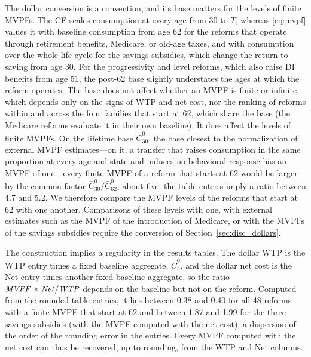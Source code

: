 The dollar conversion is a convention, and its base matters for the levels of finite MVPFs. The CE scales consumption at every age from 30 to $T$, whereas \eqref{eq:mvpf} values it with baseline consumption from age 62 for the reforms that operate through retirement benefits, Medicare, or old-age taxes, and with consumption over the whole life cycle for the savings subsidies, which change the return to saving from age 30. For the progressivity and level reforms, which also raise DI benefits from age 51, the post-62 base slightly understates the ages at which the reform operates. The base does not affect whether an MVPF is finite or infinite, which depends only on the signs of WTP and net cost, nor the ranking of reforms within and across the four families that start at 62, which share the base (the Medicare reforms evaluate it in their own baseline). It does affect the levels of finite MVPFs. On the lifetime base $\bar C^{0}_{30}$, the base closest to the normalization of external MVPF estimates---on it, a transfer that raises consumption in the same proportion at every age and state and induces no behavioral response has an MVPF of one---every finite MVPF of a reform that starts at 62 would be larger by the common factor $\bar C^{0}_{30}/\bar C^{0}_{62}$, about five: the table entries imply a ratio between 4.7 and 5.2. %
We therefore compare the MVPF levels of the reforms that start at 62 with one another. Comparisons of these levels with one, with external estimates such as the MVPF of the introduction of Medicare, or with the MVPFs of the savings subsidies require the conversion of Section~\ref{sec:disc_dollars}.

The construction implies a regularity in the results tables. The dollar WTP is the WTP entry times a fixed baseline aggregate, $\bar C^{0}_{s}$, and the dollar net cost is the Net entry times another fixed baseline aggregate, so the ratio $\mathit{MVPF}\times\mathit{Net}/\mathit{WTP}$ depends on the baseline but not on the reform. Computed from the rounded table entries, it lies between 0.38 and 0.40 for all 48 reforms with a finite MVPF that start at 62 and between 1.87 and 1.99 for the three savings subsidies (with the MVPF computed with the net cost), a dispersion of the order of the rounding error in the entries. %
Every MVPF computed with the net cost can thus be recovered, up to rounding, from the WTP and Net columns.

